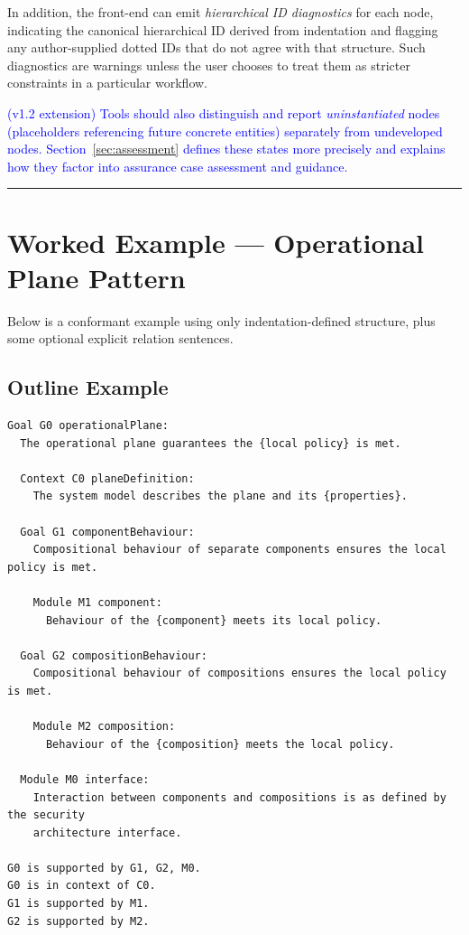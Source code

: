 \documentclass[11pt]{article}
\begin{document}
In addition, the front-end can emit \emph{hierarchical ID diagnostics} for each node, indicating the canonical hierarchical ID derived from indentation and flagging any author-supplied dotted IDs that do not agree with that structure. Such diagnostics are warnings unless the user chooses to treat them as stricter constraints in a particular workflow.

\textcolor{blue}{(v1.2 extension) Tools should also distinguish and report \emph{uninstantiated} nodes (placeholders referencing future concrete entities) separately from undeveloped nodes. Section~\ref{sec:assessment} defines these states more precisely and explains how they factor into assurance case assessment and guidance.}

\bigskip
\hrule
\bigskip

\section{Worked Example --- Operational Plane Pattern}

Below is a conformant example using only indentation-defined structure, plus some optional explicit relation sentences.

\subsection{Outline Example}

\begin{verbatim}
Goal G0 operationalPlane:
  The operational plane guarantees the {local policy} is met.

  Context C0 planeDefinition:
    The system model describes the plane and its {properties}.

  Goal G1 componentBehaviour:
    Compositional behaviour of separate components ensures the local policy is met.

    Module M1 component:
      Behaviour of the {component} meets its local policy.

  Goal G2 compositionBehaviour:
    Compositional behaviour of compositions ensures the local policy is met.

    Module M2 composition:
      Behaviour of the {composition} meets the local policy.

  Module M0 interface:
    Interaction between components and compositions is as defined by the security
    architecture interface.

G0 is supported by G1, G2, M0.
G0 is in context of C0.
G1 is supported by M1.
G2 is supported by M2.
\end{verbatim}
\end{document}
